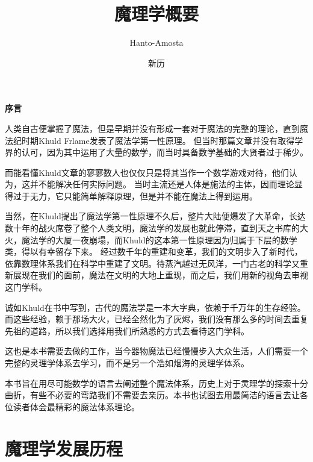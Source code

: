 \documentclass[UTF8,12pt]{ctexart}
\title{\textbf{魔理学概要}}
\author{Hanto-Amosta}
\date{新历}
\begin{document}
    \maketitle
    \newpage
        \setcounter{page}{1}

        \begin{center}
            \Huge\textbf{序言}
        \end{center}
            
            人类自古便掌握了魔法，但是早期并没有形成一套对于魔法的完整的理论，直到魔法纪时期Khuld Frlame发表了魔法学第一性原理。
            但当时那篇文章并没有取得学界的认可，因为其中运用了大量的数学，而当时具备数学基础的大贤者过于稀少。

            而能看懂Khuld文章的寥寥数人也仅仅只是将其当作一个数学游戏对待，他们认为，这并不能解决任何实际问题。
            当时主流还是人体是施法的主体，因而理论显得过于无力，它只能简单解释原理，但是并不能在魔法上得到运用。
            
            当然，在Khuld提出了魔法学第一性原理不久后，整片大陆便爆发了大革命，长达数十年的战火席卷了整个人类文明，魔法学的发展也就此停滞，直到天之书库的大火，魔法学的大厦一夜崩塌，而Khuld的这本第一性原理因为归属于下层的数学类，得以有幸留存下来。
            经过数千年的重建和变革，我们的文明步入了新时代，依靠数理体系我们在科学中重建了文明。待蒸汽越过无风洋，一门古老的科学又重新展现在我们的面前，魔法在文明的大地上重现，而之后，我们用新的视角去审视这门学科。

            诚如Khuld在书中写到，古代的魔法学是一本大字典，依赖于千万年的生存经验。而这些经验，赖于那场大火，已经全然化为了灰烬，我们没有那么多的时间去重复先祖的道路，所以我们选择用我们所熟悉的方式去看待这门学科。

            这也是本书需要去做的工作，当今器物魔法已经慢慢步入大众生活，人们需要一个完整的灵理学体系去学习，而不是另一个浩如烟海的灵理学体系。

            本书旨在用尽可能数学的语言去阐述整个魔法体系，历史上对于灵理学的探索十分曲折，有些不必要的弯路我们不需要去亲历。本书也试图去用最简洁的语言去让各位读者体会最精彩的魔法体系理论。
            
    \newpage
    \tableofcontents
    \newpage

    \section{魔理学发展历程}
\end{document}
